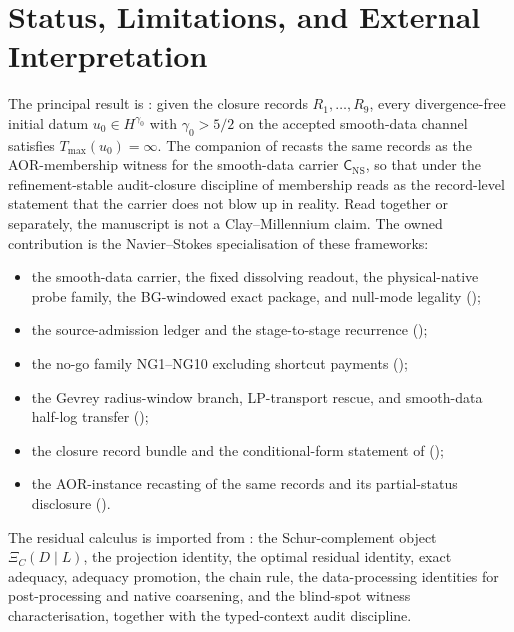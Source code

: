 \documentclass[11pt]{article}
\newcommand{\Tmax}{T_{\max}}
\theoremstyle{definition}
\begin{document}
 

\section{Status, Limitations, and External Interpretation}
\label{sec:status}

The principal result is
: given the closure
records \(R_1,\ldots,R_9\), every divergence-free initial datum
\(u_0\in H^{\gamma_0}\) with \(\gamma_0>5/2\) on the accepted
smooth-data channel satisfies \(\Tmax(u_0)=\infty\).  The companion
 of  recasts
the same records as the AOR-membership witness for the smooth-data
carrier \(\mathsf C_{\mathrm{NS}}\), so that under the
refinement-stable audit-closure discipline of
\citet{Tsiokos2026AOR} membership reads as the record-level statement
that the carrier does not blow up in reality.  Read together or
separately, the manuscript is not a Clay--Millennium claim.  The
owned contribution is the Navier--Stokes specialisation of these
frameworks:
\begin{itemize}
\item the smooth-data carrier, the fixed dissolving readout, the
physical-native probe family, the BG-windowed exact package, and
null-mode legality ();
\item the source-admission ledger and the stage-to-stage recurrence
();
\item the no-go family NG1--NG10 excluding shortcut payments
();
\item the Gevrey radius-window branch, LP-transport rescue, and
smooth-data half-log transfer ();
\item the closure record bundle and the conditional-form statement
of 
();
\item the AOR-instance recasting of the same records and its
partial-status disclosure ().
\end{itemize}

The residual calculus is imported from
\citet{Tsiokos2026XiCompanion}: the Schur-complement object
\(\Xi_C(D\mid L)\), the projection identity, the optimal residual
identity, exact adequacy, adequacy promotion, the chain rule, the
data-processing identities for post-processing and native coarsening,
and the blind-spot witness characterisation, together with the
typed-context audit discipline.
\end{document}
